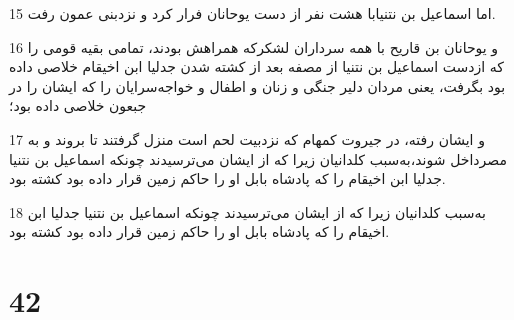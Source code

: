 \par 15 اما اسماعیل بن نتنیابا هشت نفر از دست یوحانان فرار کرد و نزدبنی عمون رفت.
\par 16 و یوحانان بن قاریح با همه سرداران لشکرکه همراهش بودند، تمامی بقیه قومی را که ازدست اسماعیل بن نتنیا از مصفه بعد از کشته شدن جدلیا ابن اخیقام خلاصی داده بود بگرفت، یعنی مردان دلیر جنگی و زنان و اطفال و خواجه‌سرایان را که ایشان را در جبعون خلاصی داده بود؛
\par 17 و ایشان رفته، در جیروت کمهام که نزدبیت لحم است منزل گرفتند تا بروند و به مصرداخل شوند،به‌سبب کلدانیان زیرا که از ایشان می‌ترسیدند چونکه اسماعیل بن نتنیا جدلیا ابن اخیقام را که پادشاه بابل او را حاکم زمین قرار داده بود کشته بود.
\par 18 به‌سبب کلدانیان زیرا که از ایشان می‌ترسیدند چونکه اسماعیل بن نتنیا جدلیا ابن اخیقام را که پادشاه بابل او را حاکم زمین قرار داده بود کشته بود.
 
\chapter{42}

